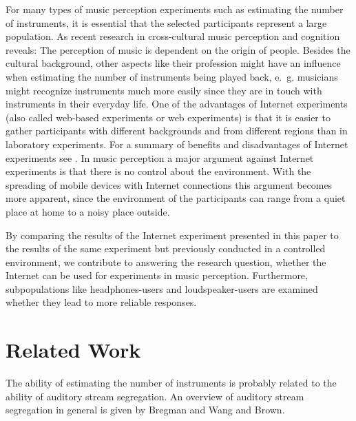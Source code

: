 For many types of music perception experiments such as estimating the number of instruments, it is essential that the selected participants represent a large population. As recent research in cross-cultural music perception and cognition reveals: The perception of music is dependent on the origin of people\cite{Stevens2012}. Besides the cultural background, other aspects like their profession might have an influence when estimating the number of instruments being played back, e.~g. musicians might recognize instruments much more easily since they are in touch with instruments in their everyday life. One of the advantages of Internet experiments (also called web-based experiments or web experiments) is that it is easier to gather participants with different backgrounds and from different regions than in laboratory experiments. For a summary of benefits and disadvantages of Internet experiments see \cite{Reips2002}. In music perception a major argument against Internet experiments is that there is no control about the environment. With the spreading of mobile devices with Internet connections this argument becomes more apparent, since the environment of the participants can range from a quiet place at home to a noisy place outside.

By comparing the results of the Internet experiment presented in this paper to the results of the same experiment but previously conducted in a controlled environment\cite{Stoter2013}, we contribute to answering the research question, whether the Internet can be used for experiments in music perception. Furthermore, subpopulations like headphones-users and loudspeaker-users are examined whether they lead to more reliable responses.

\section{Related Work}\label{sec:related_work}
The ability of estimating the number of instruments is probably related to the ability of auditory stream segregation. An overview of auditory stream segregation in general is given by Bregman\cite{Bregman1990} and Wang and Brown\cite{wang2006}.

